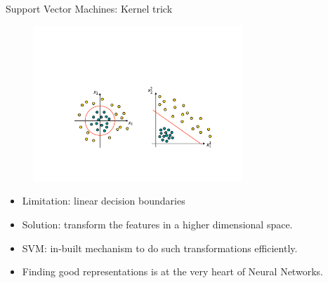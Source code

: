 \documentclass[xcolor=pdftex,dvipsnames,table]{beamer}
\begin{document}

\begin{frame}{Support Vector Machines: Kernel trick}
	\begin{figure}[htb]
		\includegraphics[width=0.7\textwidth]{../graphics/KernelTrick.pdf}
	\end{figure}
	\begin{itemize}
		\item Limitation: linear decision boundaries
		\item Solution: transform the features in a higher dimensional space.
		\item SVM: in-built mechanism to do such transformations efficiently.
		\item Finding good representations is at the very heart of Neural Networks. 
	\end{itemize}
\end{frame}
\end{document}
